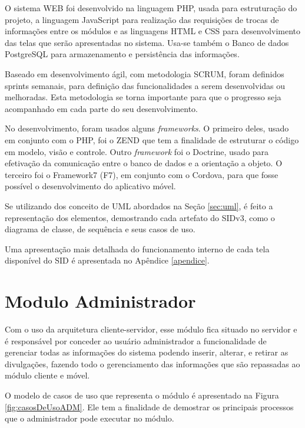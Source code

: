 O sistema WEB foi desenvolvido na linguagem PHP, usada para estruturação do projeto, a linguagem JavaScript para realização das requisições de trocas de informações entre os módulos e as linguagens HTML e CSS para desenvolvimento das telas que serão apresentadas no sistema. Usa-se também o Banco de dados PostgreSQL para armazenamento e persistência das informações.

Baseado em desenvolvimento ágil, com metodologia SCRUM, foram definidos sprints semanais, para definição das funcionalidades a serem desenvolvidas ou melhoradas. Esta metodologia se torna importante para que o progresso seja acompanhado em cada parte do seu desenvolvimento.

No desenvolvimento, foram usados alguns \textit{frameworks}. O primeiro deles, usado em conjunto com o PHP, foi o ZEND que tem a finalidade de estruturar o código em modelo, visão e controle. Outro \textit{framework} foi o Doctrine, usado para efetivação da comunicação entre o banco de dados e a orientação a objeto. O terceiro foi o Framework7 (F7), em conjunto com o Cordova, para que fosse possível o desenvolvimento do aplicativo móvel. 

Se utilizando dos conceito de UML abordados na Seção \ref{sec:uml}, é  feito a representação dos elementos, demostrando cada artefato do SIDv3, como o diagrama de classe, de sequência e seus casos de uso.

Uma apresentação mais detalhada do funcionamento interno de cada tela disponível do SID é apresentada no Apêndice \ref{apendice}.

\section{Modulo Administrador}
Com o uso da arquitetura cliente-servidor, esse módulo fica situado no servidor e é responsável por conceder ao usuário administrador a funcionalidade de gerenciar todas as informações do sistema podendo inserir, alterar, e retirar as divulgações, fazendo todo o gerenciamento das informações que são repassadas ao módulo cliente e móvel.

O modelo de casos de uso que representa o módulo é apresentado na Figura \ref{fig:casosDeUsoADM}. Ele tem a finalidade de demostrar os principais processos que o administrador pode executar no módulo.

